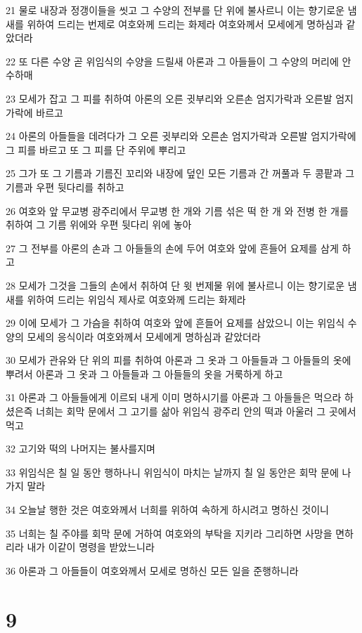 \par 21 물로 내장과 정갱이들을 씻고 그 수양의 전부를 단 위에 불사르니 이는 향기로운 냄새를 위하여 드리는 번제로 여호와께 드리는 화제라 여호와께서 모세에게 명하심과 같았더라
\par 22 또 다른 수양 곧 위임식의 수양을 드릴새 아론과 그 아들들이 그 수양의 머리에 안수하매
\par 23 모세가 잡고 그 피를 취하여 아론의 오른 귓부리와 오른손 엄지가락과 오른발 엄지가락에 바르고
\par 24 아론의 아들들을 데려다가 그 오른 귓부리와 오른손 엄지가락과 오른발 엄지가락에 그 피를 바르고 또 그 피를 단 주위에 뿌리고
\par 25 그가 또 그 기름과 기름진 꼬리와 내장에 덮인 모든 기름과 간 꺼풀과 두 콩팥과 그 기름과 우편 뒷다리를 취하고
\par 26 여호와 앞 무교병 광주리에서 무교병 한 개와 기름 섞은 떡 한 개 와 전병 한 개를 취하여 그 기름 위에와 우편 뒷다리 위에 놓아
\par 27 그 전부를 아론의 손과 그 아들들의 손에 두어 여호와 앞에 흔들어 요제를 삼게 하고
\par 28 모세가 그것을 그들의 손에서 취하여 단 윗 번제물 위에 불사르니 이는 향기로운 냄새를 위하여 드리는 위임식 제사로 여호와께 드리는 화제라
\par 29 이에 모세가 그 가슴을 취하여 여호와 앞에 흔들어 요제를 삼았으니 이는 위임식 수양의 모세의 응식이라 여호와께서 모세에게 명하심과 같았더라
\par 30 모세가 관유와 단 위의 피를 취하여 아론과 그 옷과 그 아들들과 그 아들들의 옷에 뿌려서 아론과 그 옷과 그 아들들과 그 아들들의 옷을 거룩하게 하고
\par 31 아론과 그 아들들에게 이르되 내게 이미 명하시기를 아론과 그 아들들은 먹으라 하셨은즉 너희는 회막 문에서 그 고기를 삶아 위임식 광주리 안의 떡과 아울러 그 곳에서 먹고
\par 32 고기와 떡의 나머지는 불사를지며
\par 33 위임식은 칠 일 동안 행하나니 위임식이 마치는 날까지 칠 일 동안은 회막 문에 나가지 말라
\par 34 오늘날 행한 것은 여호와께서 너희를 위하여 속하게 하시려고 명하신 것이니
\par 35 너희는 칠 주야를 회막 문에 거하여 여호와의 부탁을 지키라 그리하면 사망을 면하리라 내가 이같이 명령을 받았느니라
\par 36 아론과 그 아들들이 여호와께서 모세로 명하신 모든 일을 준행하니라

\chapter{9}

